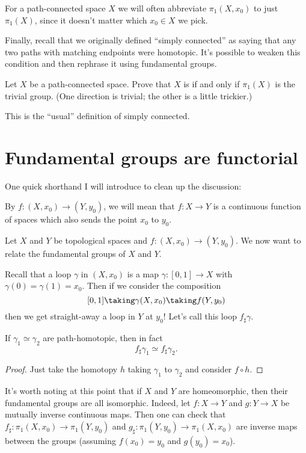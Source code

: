 \begin{abuse}
	For a path-connected space $X$ we will often abbreviate $\pi_1(X, x_0)$
	to just $\pi_1(X)$, since it doesn't matter which $x_0 \in X$
	we pick.
\end{abuse}

Finally, recall that we originally defined ``simply connected'' as saying
that any two paths with matching endpoints were homotopic.
It's possible to weaken this condition and then rephrase it using
fundamental groups.
\begin{exercise}
	Let $X$ be a path-connected space.
	Prove that $X$ is  if and only if
	$\pi_1(X)$ is the trivial group.
	(One direction is trivial; the other is a little trickier.)
\end{exercise}
This is the ``usual'' definition of simply connected.


\section{Fundamental groups are functorial}
One quick shorthand I will introduce to clean up the discussion:
\begin{definition}
	By $f : (X, x_0) \to (Y, y_0)$, we will mean that
	$f : X \to Y$ is a continuous function of spaces
	which also sends the point $x_0$ to $y_0$.
\end{definition}

Let $X$ and $Y$ be topological spaces and $f : (X, x_0) \to (Y, y_0)$.
We now want to relate the fundamental groups of $X$ and $Y$.

Recall that a loop $\gamma$ in $(X, x_0)$ is a map $\gamma : [0,1] \to X$
with $\gamma(0) = \gamma(1) = x_0$.
Then if we consider the composition
\[ [0,1] \taking\gamma (X, x_0) \taking f (Y, y_0) \]
then we get straight-away a loop in $Y$ at $y_0$!
Let's call this loop $f_\sharp \gamma$.
\begin{lemma}
	\label{lem:fsharp_homotopy_invariant}
	If $\gamma_1 \simeq \gamma_2$ are path-homotopic,
	then in fact
	\[ f_\sharp \gamma_1 \simeq f_\sharp \gamma_2. \]
\end{lemma}
\begin{proof}
	Just take the homotopy $h$ taking $\gamma_1$ to $\gamma_2$	
	and consider $f \circ h$.
\end{proof}

It's worth noting at this point that if $X$ and $Y$ are homeomorphic,
then their fundamental groups are all isomorphic.
Indeed, let $f : X \to Y$ and $g : Y \to X$ be mutually inverse continuous maps.
Then one can check that $f_\sharp : \pi_1(X, x_0) \to \pi_1(Y, y_0)$
and $g_\sharp : \pi_1(Y, y_0) \to \pi_1(X, x_0)$ are inverse maps
between the groups (assuming $f(x_0) = y_0$ and $g(y_0) = x_0$).

